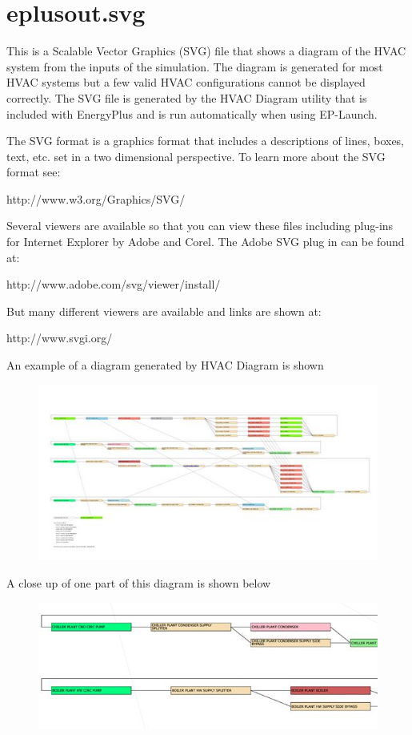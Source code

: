 \section{eplusout.svg}\label{eplusout.svg}

This is a Scalable Vector Graphics (SVG) file that shows a diagram of the HVAC system from the inputs of the simulation. The diagram is generated for most HVAC systems but a few valid HVAC configurations cannot be displayed correctly. The SVG file is generated by the HVAC Diagram utility that is included with EnergyPlus and is run automatically when using EP-Launch.

The SVG format is a graphics format that includes a descriptions of lines, boxes, text, etc. set in a two dimensional perspective. To learn more about the SVG format see:

http://www.w3.org/Graphics/SVG/

Several viewers are available so that you can view these files including plug-ins for Internet Explorer by Adobe and Corel. The Adobe SVG plug in can be found at:

http://www.adobe.com/svg/viewer/install/

But many different viewers are available and links are shown at:

http://www.svgi.org/

An example of a diagram generated by HVAC Diagram is shown

\begin{figure}[htbp]
\centering
\includegraphics{media/image023.jpg}
\caption{}
\end{figure}

A close up of one part of this diagram is shown below

\begin{figure}[htbp]
\centering
\includegraphics{media/image024.jpg}
\caption{}
\end{figure}

